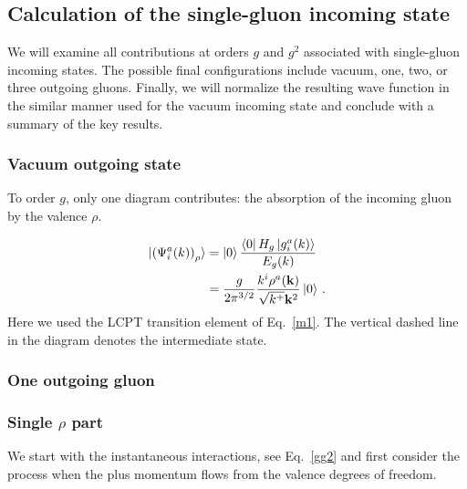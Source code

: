 \documentclass[a4paper,11pt]{article}
\def\v#1{\mathbf{#1}}
\begin{document}
\subsection{Calculation of the single-gluon incoming state}\label{sec:singleglue}
 We will examine all contributions at orders $g$ and $g^{2}$ associated with single-gluon incoming states. The possible final configurations include vacuum, one, two, or three outgoing gluons. Finally, we will normalize the resulting wave function in the similar manner used for the vacuum incoming state and conclude with a summary of the key results.
 
\subsubsection{Vacuum outgoing state}
To order $g$, only one diagram contributes: the absorption of the incoming gluon by the valence $\rho$.

\begin{figure}[htbp]
\centering
\end{figure}
\begin{align}
\ket{ \left(\Psi^{a}_{i}(k) \right)_{\rho} }
   & =
   \ket{0}\frac{\bra{0}H_{g}\ket{g^a_{i}(k)}}{E_{g}(k)}
   \\
   &= \frac{g}{ 2\pi^{3/2}}\frac{k^i \rho^{a}(\v{k})}{\sqrt{k^+} \v{k}^{2}} \ket{0}  \,.
\end{align}
Here we used the LCPT transition element of Eq.~\eqref{m1}. The vertical dashed line in the diagram denotes the intermediate state.  
\subsubsection{One outgoing gluon}
\subsubsection*{Single $\rho$ part}
We start with the instantaneous interactions, see Eq.~\eqref{gg2} and   first consider  the process when the plus momentum flows from the valence degrees of freedom. 
\end{document}
